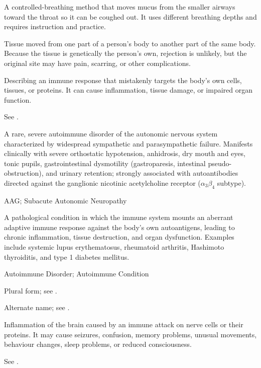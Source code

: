  A controlled-breathing method that moves mucus from the smaller airways toward the throat so it can be coughed out. It uses different breathing depths and requires instruction and practice.

 Tissue moved from one part of a person's body to another part of the same body. Because the tissue is genetically the person's own, rejection is unlikely, but the original site may have pain, scarring, or other complications.

 Describing an immune response that mistakenly targets the body's own cells, tissues, or proteins. It can cause inflammation, tissue damage, or impaired organ function.

 See .

 A rare, severe autoimmune disorder of the autonomic nervous system characterized by widespread sympathetic and parasympathetic failure. Manifests clinically with severe orthostatic hypotension, anhidrosis, dry mouth and eyes, tonic pupils, gastrointestinal dysmotility (gastroparesis, intestinal pseudo-obstruction), and urinary retention; strongly associated with autoantibodies directed against the ganglionic nicotinic acetylcholine receptor ($\alpha_3\beta_4$ subtype).

\synonyms
AAG; Subacute Autonomic Neuropathy

 A pathological condition in which the immune system mounts an aberrant adaptive immune response against the body's own autoantigens, leading to chronic inflammation, tissue destruction, and organ dysfunction. Examples include systemic lupus erythematosus, rheumatoid arthritis, Hashimoto thyroiditis, and type 1 diabetes mellitus.

\synonyms
Autoimmune Disorder; Autoimmune Condition

 Plural form; see .

 Alternate name; see .

 Inflammation of the brain caused by an immune attack on nerve cells or their proteins. It may cause seizures, confusion, memory problems, unusual movements, behaviour changes, sleep problems, or reduced consciousness.

 See .

